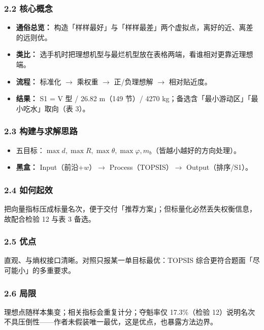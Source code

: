 \documentclass[UTF8,a4paper,zihao=-4]{ctexart}
\begin{document}
\subsubsection{\texorpdfstring{2.2 核心概念}{2.2 核心概念}}
\begin{itemize}[leftmargin=1.5em]
\item \textbf{通俗总览：} 构造「样样最好」与「样样最差」两个虚拟点，离好的近、离差的远则优。
\item \textbf{类比：} 选手机时把理想机型与最烂机型放在表格两端，看谁相对更靠近理想端。
\item \textbf{流程：} 标准化 $\rightarrow$ 乘权重 $\rightarrow$ 正/负理想解 $\rightarrow$ 相对贴近度。
\item \textbf{结果：} S1 = V 型 / 26.82 m（149 节）/ 4270 kg；备选含「最小游动区」「最小吃水」取向（表 3）。
\end{itemize}

\subsubsection{\texorpdfstring{2.3 构建与求解思路}{2.3 构建与求解思路}}
\begin{itemize}[leftmargin=1.5em]
\item 五目标：\(\max d,\max R,\max\theta,\max\varphi,m_b\)（皆越小越好的方向处理）。
\item \textbf{黑盒：} Input（前沿+\(w\)）$\rightarrow$ Process（TOPSIS）$\rightarrow$ Output（排序/S1）。
\end{itemize}

\subsubsection{\texorpdfstring{2.4 如何起效}{2.4 如何起效}}
把向量指标压成标量名次，便于交付「推荐方案」；但标量化必然丢失权衡信息，故配合检验 12 与表 3 备选。

\subsubsection{\texorpdfstring{2.5 优点}{2.5 优点}}
直观、与熵权接口清晰。对照只报某一单目标最优：TOPSIS 综合更符合题面「尽可能小」的多重要求。

\subsubsection{\texorpdfstring{2.6 局限}{2.6 局限}}
理想点随样本集变；相关指标会重复计分；夺魁率仅 17.3\%（检验 12）说明名次不具压倒性------作者未假装唯一最优，这是优点，也暴露方法边界。
\end{document}
